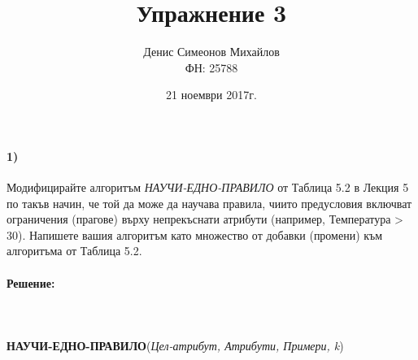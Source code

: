 \documentclass{article}
\begin{document}
\title{Упражнение 3}
\author{Денис Симеонов Михайлов \\ ФН: 25788}
\date{21 ноември 2017г.}
\maketitle
\paragraph{1)}
Модифицирайте алгоритъм \textit{НАУЧИ-ЕДНО-ПРАВИЛО} от Таблица 5.2 в Лекция 5 по такъв начин, че той да може да научава правила, чиито предусловия включват
ограничения (прагове) върху непрекъснати атрибути (например, Температура > 30). Напишете вашия алгоритъм като множество от добавки (промени) към
алгоритъма от Таблица 5.2.

\paragraph{Решение:}\mbox{}\\\\
\textbf{НАУЧИ-ЕДНО-ПРАВИЛО}(\textit{Цел-атрибут, Атрибути, Примери, k})
\end{document}
